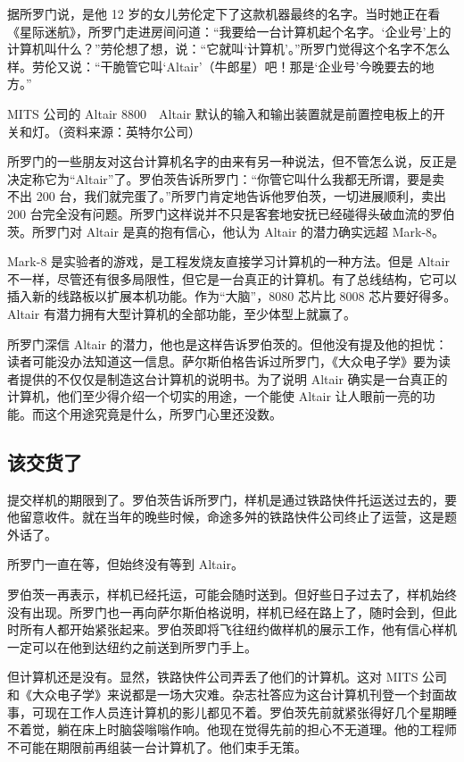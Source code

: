 \documentclass[12pt,UTF8]{ctexbook}
\begin{document}
据所罗门说，是他 12 岁的女儿劳伦定下了这款机器最终的名字。当时她正在看《星际迷航》，所罗门走进房间问道：“我要给一台计算机起个名字。‘企业号’上的计算机叫什么？”劳伦想了想，说：“它就叫‘计算机’。”所罗门觉得这个名字不怎么样。劳伦又说：“干脆管它叫‘Altair’（牛郎星）吧！那是‘企业号’今晚要去的地方。”



MITS 公司的 Altair 8800　Altair 默认的输入和输出装置就是前置控电板上的开关和灯。（资料来源：英特尔公司）

所罗门的一些朋友对这台计算机名字的由来有另一种说法，但不管怎么说，反正是决定称它为“Altair”了。罗伯茨告诉所罗门：“你管它叫什么我都无所谓，要是卖不出 200 台，我们就完蛋了。”所罗门肯定地告诉他罗伯茨，一切进展顺利，卖出 200 台完全没有问题。所罗门这样说并不只是客套地安抚已经碰得头破血流的罗伯茨。所罗门对 Altair 是真的抱有信心，他认为 Altair 的潜力确实远超 Mark-8。

Mark-8 是实验者的游戏，是工程发烧友直接学习计算机的一种方法。但是 Altair 不一样，尽管还有很多局限性，但它是一台真正的计算机。有了总线结构，它可以插入新的线路板以扩展本机功能。作为“大脑”，8080 芯片比 8008 芯片要好得多。Altair 有潜力拥有大型计算机的全部功能，至少体型上就赢了。

所罗门深信 Altair 的潜力，他也是这样告诉罗伯茨的。但他没有提及他的担忧：读者可能没办法知道这一信息。萨尔斯伯格告诉过所罗门，《大众电子学》要为读者提供的不仅仅是制造这台计算机的说明书。为了说明 Altair 确实是一台真正的计算机，他们至少得介绍一个切实的用途，一个能使 Altair 让人眼前一亮的功能。而这个用途究竟是什么，所罗门心里还没数。





\subsection{该交货了}


提交样机的期限到了。罗伯茨告诉所罗门，样机是通过铁路快件托运送过去的，要他留意收件。就在当年的晚些时候，命途多舛的铁路快件公司终止了运营，这是题外话了。

所罗门一直在等，但始终没有等到 Altair。

罗伯茨一再表示，样机已经托运，可能会随时送到。但好些日子过去了，样机始终没有出现。所罗门也一再向萨尔斯伯格说明，样机已经在路上了，随时会到，但此时所有人都开始紧张起来。罗伯茨即将飞往纽约做样机的展示工作，他有信心样机一定可以在他到达纽约之前送到所罗门手上。

但计算机还是没有。显然，铁路快件公司弄丢了他们的计算机。这对 MITS 公司和《大众电子学》来说都是一场大灾难。杂志社答应为这台计算机刊登一个封面故事，可现在工作人员连计算机的影儿都见不着。罗伯茨先前就紧张得好几个星期睡不着觉，躺在床上时脑袋嗡嗡作响。他现在觉得先前的担心不无道理。他的工程师不可能在期限前再组装一台计算机了。他们束手无策。
\end{document}
